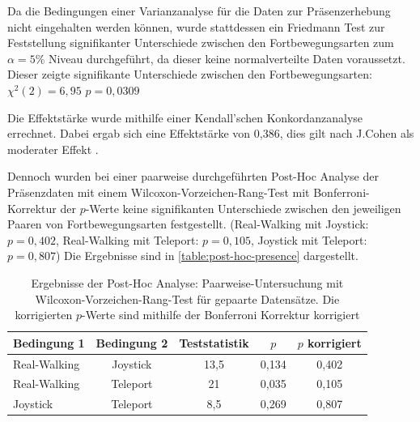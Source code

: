                     Da die Bedingungen einer Varianzanalyse für die Daten zur Präsenzerhebung nicht eingehalten werden können, wurde stattdessen ein Friedmann Test zur Feststellung signifikanter Unterschiede zwischen den Fortbewegungsarten zum $\alpha = 5\%$ Niveau durchgeführt, da dieser keine normalverteilte Daten voraussetzt.
                    Dieser zeigte signifikante Unterschiede zwischen den Fortbewegungsarten: $\chi^2(2) = 6,95$  $p = 0,0309$

                    Die Effektstärke wurde mithilfe einer  Kendall’schen Konkordanzanalyse errechnet. Dabei ergab sich eine Effektstärke von 0,386, dies gilt nach J.Cohen %
                    als moderater Effekt \cite{cohen}.


                    Dennoch wurden bei einer paarweise durchgeführten Post-Hoc Analyse der Präsenzdaten mit einem
                    Wilcoxon-Vorzeichen-Rang-Test mit Bonferroni-Korrektur der $p$-Werte keine signifikanten Unterschiede zwischen den jeweiligen Paaren von Fortbewegungsarten festgestellt. (Real-Walking mit Joystick: $p = 0,402$, Real-Walking mit Teleport: $p = 0,105$, Joystick mit Teleport: $p = 0,807$) Die Ergebnisse sind in \autoref{table:post-hoc-presence} dargestellt.

\begin{table}[!ht]
    \renewcommand\arraystretch{1.2}
    \centering
    \begin{tabular}{lcccc} \toprule
Bedingung 1& Bedingung 2& Teststatistik &  $p$  & $p$ korrigiert \\ \midrule
Real-Walking & Joystick & 13,5          & 0,134 & 0,402         \\
Real-Walking & Teleport & 21            & 0,035 & 0,105         \\
Joystick     & Teleport & 8,5           & 0,269 & 0,807 \\ \bottomrule
    \end{tabular}
    \caption{Ergebnisse der Post-Hoc Analyse: Paarweise-Untersuchung mit Wilcoxon-Vorzeichen-Rang-Test für gepaarte Datensätze. Die korrigierten $p$-Werte sind mithilfe der Bonferroni Korrektur korrigiert}\label{table:post-hoc-presence}
\end{table}

